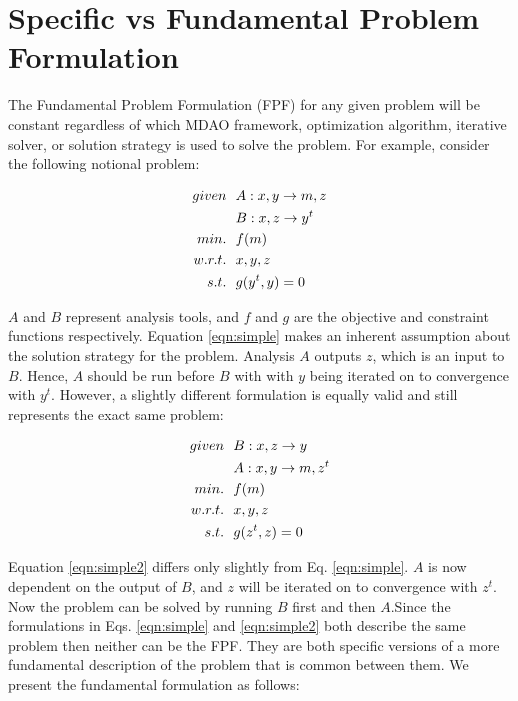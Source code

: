 \section{Specific vs Fundamental Problem Formulation }
    \label{sec:spg_vs_fpg}

    The Fundamental Problem Formulation (FPF) for any given problem will be constant regardless 
    of which MDAO framework, optimization algorithm, iterative solver, or solution strategy
    is used to solve the problem. For example, consider the following notional problem: 

    \begin{align}
        given & \ \ A: {x,y} \rightarrow {m,z} \notag
        \\      & \ \ B: {x,z} \rightarrow {y^t} \notag
        \\min. &\ \ f(m) \notag
        \\w.r.t. & \ \ x,y,z \notag
        \\s.t. & \ \ g(y^t,y) = 0
        \label{eqn:simple}
    \end{align}

    $A$ and $B$ represent analysis tools, and $f$ and $g$ are the objective and constraint functions respectively. 
    Equation \ref{eqn:simple} makes an inherent assumption about the solution strategy for the problem. 
    Analysis $A$ outputs $z$, which is an input to $B$. Hence, $A$ should be run before $B$ with 
    with $y$ being iterated on to convergence with $y^t$. However, a slightly different formulation is 
    equally valid and still represents the exact same problem: 

    \begin{align}
        given & \ \ B: {x,z} \rightarrow {y} \notag
        \\      & \ \ A: {x,y} \rightarrow {m,z^t} \notag
        \\min. &\ \ f(m) \notag
        \\w.r.t. & \ \ x,y,z \notag
        \\s.t. & \ \ g(z^t,z) = 0
        \label{eqn:simple2}
    \end{align}

    Equation \ref{eqn:simple2} differs only slightly from Eq. \ref{eqn:simple}. 
    $A$ is now dependent on the output of $B$, and $z$ will be iterated on to 
    convergence with $z^t$. Now the problem can be solved by running $B$ first 
    and then $A$.Since the formulations in Eqs. \ref{eqn:simple} and 
    \ref{eqn:simple2} both describe the same problem then neither can be the
    FPF. They are both specific versions of a more fundamental description of 
    the problem that is common between them. We present the fundamental 
    formulation as follows: 

